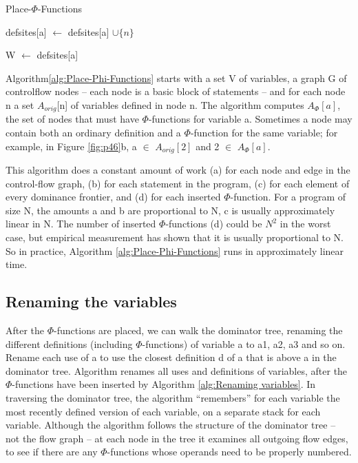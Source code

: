 \begin{algorithm}
\caption{Place-$\Phi$-Functions}\label{alg:Place-Phi-Functions}
\begin{algorithmic}
\State defsites[a] $\gets$ defsites[a] $\cup \{n\}$
\EndFor
\EndFor


\State W $\gets$ defsites[a]
\EndIf

\EndIf
\EndFor
\EndWhile
\EndFor

\end{algorithmic}
\end{algorithm}


Algorithm\ref{alg:Place-Phi-Functions} starts with a set V of variables, a graph G of controlflow nodes – each node is a basic block of statements – and for each node n a set $A_{orig}$[n] of variables defined in node n. The algorithm
computes $A_{\Phi}[a]$, the set of nodes that must have $\Phi$-functions for variable
a. Sometimes a node may contain both an ordinary definition and a
$\Phi$-function for the same variable; for example, in Figure \ref{fig:p46}b, a $\in$ $A_{orig}[2]$
and 2 $\in$ $A_{\Phi}[a]$.


This algorithm does a constant amount of work (a) for each node and edge in the control-flow graph, (b) for each statement in the program, (c) for each element of every dominance frontier, and (d) for each inserted $\Phi$-function. For a program of size N, the amounts a and b are proportional to N, c is usually approximately linear in N. The number of inserted $\Phi$-functions (d) could be $N^2$ in the worst case, but empirical measurement has shown that it is usually proportional to N. So in practice, Algorithm \ref{alg:Place-Phi-Functions} runs in approximately linear time.


\subsection{Renaming the variables}

After the $\Phi$-functions are placed, we can walk the dominator tree, renaming the different definitions (including $\Phi$-functions) of variable a to a1, a2, a3 and so on. Rename each use of a to use the closest definition d of a that is above a in the dominator tree. Algorithm  renames all uses and definitions of variables, after the $\Phi$-functions have been inserted by Algorithm \ref{alg:Renaming variables}. In traversing the dominator tree, the algorithm “remembers” for each variable the most recently defined version of each variable, on a separate stack for each variable. Although the algorithm follows the structure of the dominator tree – not the flow graph – at each node in the tree it examines all outgoing flow edges, to see if there are any $\Phi$-functions whose operands need to be properly numbered.



